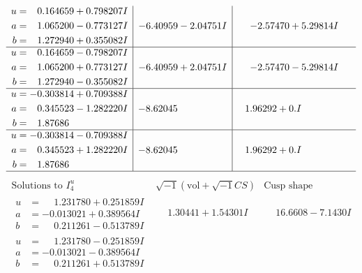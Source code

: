 \documentclass[1p]{elsarticle_modified}
\theoremstyle{definition}
\newcommand{\I}{\sqrt{-1}}
\begin{document}
$$\begin{array}{c|c|c}
\begin{aligned}
u &= \phantom{-}0.164659 + 0.798207 I \\
a &= \phantom{-}1.065200 - 0.773127 I \\
b &= \phantom{-}1.272940 + 0.355082 I\end{aligned}
 & -6.40959 - 2.04751 I & -2.57470 + 5.29814 I \\ \hline\begin{aligned}
u &= \phantom{-}0.164659 - 0.798207 I \\
a &= \phantom{-}1.065200 + 0.773127 I \\
b &= \phantom{-}1.272940 - 0.355082 I\end{aligned}
 & -6.40959 + 2.04751 I & -2.57470 - 5.29814 I \\ \hline\begin{aligned}
u &= -0.303814 + 0.709388 I \\
a &= \phantom{-}0.345523 - 1.282220 I \\
b &= \phantom{-}1.87686\phantom{ +0.000000I}\end{aligned}
 & -8.62045\phantom{ +0.000000I} & \phantom{-}1.96292 + 0. I\phantom{ +0.000000I} \\ \hline\begin{aligned}
u &= -0.303814 - 0.709388 I \\
a &= \phantom{-}0.345523 + 1.282220 I \\
b &= \phantom{-}1.87686\phantom{ +0.000000I}\end{aligned}
 & -8.62045\phantom{ +0.000000I} & \phantom{-}1.96292 + 0. I\phantom{ +0.000000I}\\
 \hline 
 \end{array}$$\newpage$$\begin{array}{c|c|c}  
\text{Solutions to }I^u_{4}& \I (\text{vol} + \sqrt{-1}CS) & \text{Cusp shape}\\
 \hline 
\begin{aligned}
u &= \phantom{-}1.231780 + 0.251859 I \\
a &= -0.013021 + 0.389564 I \\
b &= \phantom{-}0.211261 - 0.513789 I\end{aligned}
 & \phantom{-}1.30441 + 1.54301 I & \phantom{-}16.6608 - 7.1430 I \\ \hline\begin{aligned}
u &= \phantom{-}1.231780 - 0.251859 I \\
a &= -0.013021 - 0.389564 I \\
b &= \phantom{-}0.211261 + 0.513789 I\end{aligned}

\end{array}$$
\end{document}
